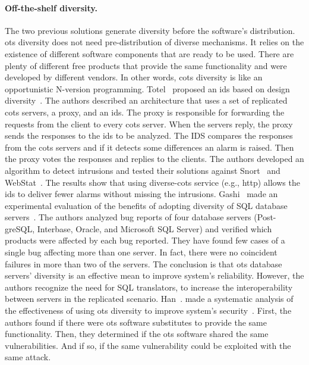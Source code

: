 \paragraph{Off-the-shelf diversity.}
The two previous solutions generate diversity before the software’s distribution. 
\gls{ots} diversity does not need pre-distribution of diverse mechanisms. 
It relies on the existence of different software components that are ready to be used.
There are plenty of different free products that provide the same functionality and were developed by different vendors. 
In other words, \gls{cots} diversity is like an opportunistic N-version programming.
Totel~\etal{} proposed an \gls{ids} based on design diversity~\cite{Totel:2005}.
The authors described an architecture that uses a set of replicated \gls{cots} servers, a proxy, and an \gls{ids}. 
The proxy is responsible for forwarding the requests from the client to every \gls{cots} server. 
When the servers reply, the proxy sends the responses to the \gls{ids} to be analyzed. 
The IDS compares the responses from the \gls{cots} servers and if it detects some differences an alarm is raised. 
Then the proxy votes the responses and replies to the clients. 
The authors developed an algorithm to detect intrusions and tested their solutions against Snort~\cite{snort} and WebStat~\cite{Vigna:2003}. 
The results show that using diverse-\gls{cots} service (e.g., http) allows the \gls{ids} to deliver fewer alarms without missing the intrusions.
Gashi~\etal{} made an experimental evaluation of the benefits of adopting diversity of SQL database servers~\cite{Gashi:2007}. 
The authors analyzed bug reports of four database servers (Post-greSQL, Interbase, Oracle, and Microsoft SQL Server) and verified which products were affected by each bug reported. 
They have found few cases of a single bug affecting more than one server. 
In fact, there were no coincident failures in more than two of the servers.
The conclusion is that \gls{ots} database servers’ diversity is an effective mean to improve system's reliability. 
However, the authors recognize the need for SQL translators, to increase the interoperability between servers in the replicated scenario.
Han~\etal{}. made a systematic analysis of the effectiveness of using \gls{ots} diversity to improve system's security~\cite{Han:2009}. 
First, the authors found if there were \gls{ots} software substitutes to provide the same functionality. 
Then, they determined if the \gls{ots} software shared the same vulnerabilities.
And if so, if the same vulnerability could be exploited with the same attack. 
